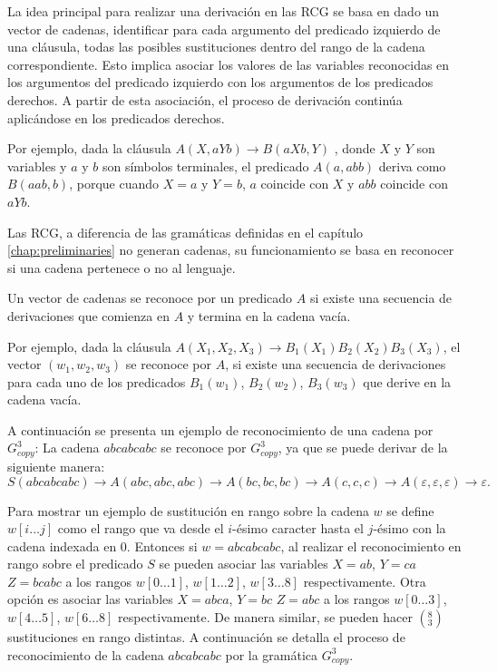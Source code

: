 La idea principal para realizar una derivación en las RCG se basa en dado un vector de cadenas, identificar para cada argumento del predicado izquierdo de una cláusula, todas las posibles sustituciones dentro del rango de la cadena correspondiente.  Esto implica asociar los valores de las variables reconocidas en los argumentos del predicado izquierdo con los argumentos de los predicados derechos. A partir de esta asociación, el proceso de derivación continúa aplicándose en los predicados derechos.

Por ejemplo, dada la cláusula $A(X,aYb)\to B(aXb,Y)$ , donde $X$ y $Y$ son variables y $a$ y $b$ son
símbolos terminales, el predicado $A(a,abb)$ deriva como $B(aab,b)$, porque cuando $ X=a$ y $Y=b$,
$a$ coincide con $X$ y $abb$ coincide con $aYb$.

Las RCG, a diferencia de las gramáticas definidas en el capítulo \ref{chap:preliminaries} no generan cadenas,
su funcionamiento se basa en reconocer si una cadena pertenece o no al lenguaje.

Un vector de cadenas se reconoce por un predicado $A$ si existe una secuencia de derivaciones que comienza en
$A$ y termina en la cadena vacía.

Por ejemplo, dada la cláusula $A(X_1,X_2,X_3)\to B_1(X_1)B_2(X_2)B_3(X_3)$, el vector $(w_1,w_2,w_3)$
se reconoce por $A$, si existe una secuencia de derivaciones para cada
uno de los predicados $B_1(w_1)$, $B_2(w_2)$, $B_3(w_3)$ que derive en la cadena vacía.

A continuación se presenta un ejemplo de reconocimiento de una cadena por $G^3_{copy}$: La cadena $abcabcabc$ se reconoce por $G^3_{copy}$, ya que se puede derivar de la siguiente manera:
$$S(abcabcabc)\to A(abc,abc,abc)\to A(bc,bc,bc)\to A(c,c,c)\to A(\varepsilon,\varepsilon,\varepsilon)\to \varepsilon.$$

Para mostrar un ejemplo de sustitución en rango sobre la cadena $w$ se define $w[i\dots j]$ como el rango que
va desde el $i$-ésimo caracter hasta el $j$-ésimo con la cadena indexada en 0. Entonces si $w=abcabcabc$,
al realizar el reconocimiento en rango sobre el predicado $S$ se pueden asociar las variables $X=ab$,
$Y=ca$ $Z=bcabc$ a los rangos $w[0\dots 1]$, $w[1\dots 2]$, $w[3\dots 8]$ respectivamente. Otra opción es
asociar las variables $X=abca$, $Y=bc$ $Z=abc$ a los rangos $w[0\dots 3]$, $w[4\dots 5]$, $w[6\dots 8]$
respectivamente. De manera similar, se pueden hacer $(^8_3)$ sustituciones en rango distintas. A
continuación se detalla el proceso de reconocimiento de la cadena $abcabcabc$ por la gramática $G^3_{copy}$.

